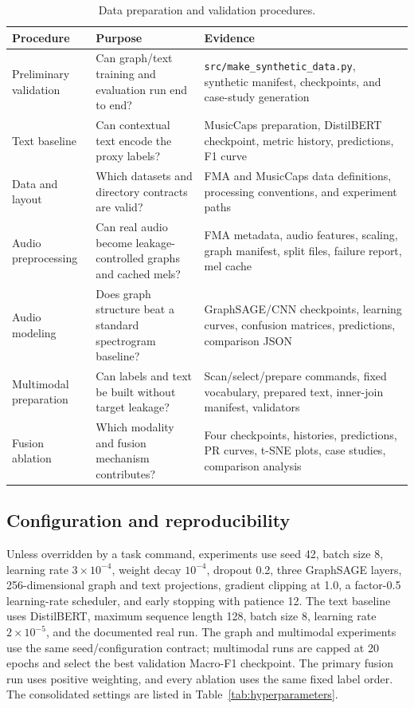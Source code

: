 \documentclass[conference]{IEEEtran}
\begin{document}
\begin{table}[t]
\caption{Data preparation and validation procedures.}
\label{tab:milestones}
\centering
\small
\begin{tabular}{p{}p{}p{}}
\toprule
Procedure & Purpose & Evidence\\
\midrule
Preliminary validation & Can graph/text training and evaluation run end to end? &
\texttt{src/make\_synthetic\_data.py}, synthetic manifest, checkpoints, and case-study generation\\
Text baseline & Can contextual text encode the proxy labels? &
MusicCaps preparation, DistilBERT checkpoint, metric history, predictions, F1 curve\\
Data and layout & Which datasets and directory contracts are valid? &
FMA and MusicCaps data definitions, processing conventions, and experiment paths\\
Audio preprocessing & Can real audio become leakage-controlled graphs and cached mels? &
FMA metadata, audio features, scaling, graph manifest, split files, failure report, mel cache\\
Audio modeling & Does graph structure beat a standard spectrogram baseline? &
GraphSAGE/CNN checkpoints, learning curves, confusion matrices, predictions, comparison JSON\\
Multimodal preparation & Can labels and text be built without target leakage? &
Scan/select/prepare commands, fixed vocabulary, prepared text, inner-join manifest, validators\\
Fusion ablation & Which modality and fusion mechanism contributes? &
Four checkpoints, histories, predictions, PR curves, t-SNE plots, case studies, comparison analysis\\
\bottomrule
\end{tabular}
\end{table}

\subsection{Configuration and reproducibility}
Unless overridden by a task command, experiments use seed 42, batch size 8,
learning rate $3\times10^{-4}$, weight decay $10^{-4}$, dropout 0.2, three
GraphSAGE layers, 256-dimensional graph and text projections, gradient
clipping at 1.0, a factor-0.5 learning-rate scheduler, and early stopping
with patience 12. The text baseline uses DistilBERT, maximum sequence length 128,
batch size 8, learning rate $2\times10^{-5}$, and the documented real run.
The graph and multimodal experiments use the same seed/configuration
contract; multimodal runs are capped at 20 epochs and select the best
validation Macro-F1 checkpoint. The primary fusion run uses positive
weighting, and every ablation uses the same fixed label order. The
consolidated settings are listed in
Table~\ref{tab:hyperparameters}.
\end{document}

